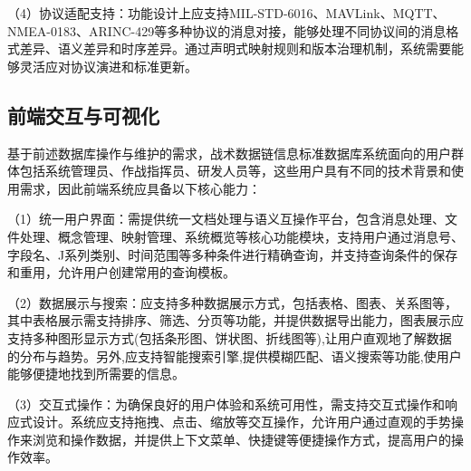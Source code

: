\begin{table}[H]
    \caption{系统API接口功能表}
    \label{table_api_interfaces}
    \centering
\end{table}

（4）协议适配支持：功能设计上应支持MIL-STD-6016、MAVLink、MQTT、NMEA-0183、ARINC-429等多种协议的消息对接，能够处理不同协议间的消息格式差异、语义差异和时序差异。通过声明式映射规则和版本治理机制，系统需要能够灵活应对协议演进和标准更新。


\subsection{前端交互与可视化}
基于前述数据库操作与维护的需求，战术数据链信息标准数据库系统面向的用户群体包括系统管理员、作战指挥员、研发人员等，这些用户具有不同的技术背景和使用需求，因此前端系统应具备以下核心能力：

（1）统一用户界面：需提供统一文档处理与语义互操作平台，包含消息处理、文件处理、概念管理、映射管理、系统概览等核心功能模块，支持用户通过消息号、字段名、J系列类别、时间范围等多种条件进行精确查询，并支持查询条件的保存和重用，允许用户创建常用的查询模板。

（2）数据展示与搜索：应支持多种数据展示方式，包括表格、图表、关系图等，其中表格展示需支持排序、筛选、分页等功能，并提供数据导出能力，图表展示应支持多种图形显示方式(包括条形图、饼状图、折线图等),让用户直观地了解数据的分布与趋势。另外,应支持智能搜索引擎,提供模糊匹配、语义搜索等功能,使用户能够便捷地找到所需要的信息。

（3）交互式操作：为确保良好的用户体验和系统可用性，需支持交互式操作和响应式设计。系统应支持拖拽、点击、缩放等交互操作，允许用户通过直观的手势操作来浏览和操作数据，并提供上下文菜单、快捷键等便捷操作方式，提高用户的操作效率。

